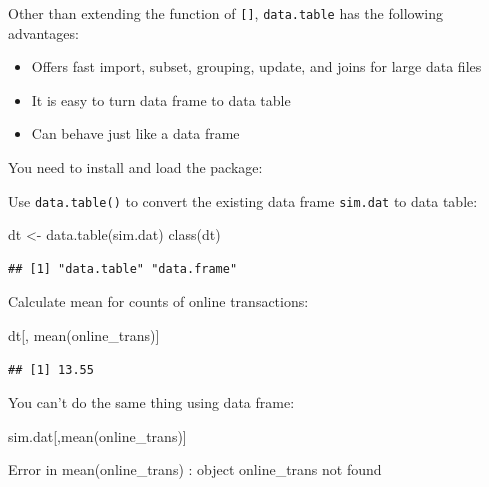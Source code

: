 \documentclass[
  12pt,
]{krantz}
\makeatletter
\newenvironment{Shaded}{\begin{snugshade}}{\end{snugshade}}
\newcommand{\FunctionTok}[1]{\textcolor[rgb]{0,0,0}{#1}}
\newcommand{\NormalTok}[1]{#1}
\newcommand{\OtherTok}[1]{\textcolor[rgb]{0.37,0.37,0.37}{#1}}
\providecommand{\tightlist}{%
  \setlength{\itemsep}{0pt}\setlength{\parskip}{0pt}}
\newenvironment{kframe}{%
\medskip{}
\setlength{\fboxsep}{.8em}
 \def\at@end@of@kframe{}%
 \ifinner\ifhmode%
  \def\at@end@of@kframe{\end{minipage}}%
  \begin{minipage}{\columnwidth}%
 \fi\fi%
 \def\FrameCommand##1{\hskip\@totalleftmargin \hskip-\fboxsep
 \colorbox{shadecolor}{##1}\hskip-\fboxsep
     \hskip-\linewidth \hskip-\@totalleftmargin \hskip\columnwidth}%
 \MakeFramed {\advance\hsize-\width
   \@totalleftmargin\z@ \linewidth\hsize
   \@setminipage}}%
 {\par\unskip\endMakeFramed%
 \at@end@of@kframe}
\renewenvironment{Shaded}{\begin{kframe}}{\end{kframe}}
\makeatother
\begin{document}
Other than extending the function of \texttt{{[}{]}}, \texttt{data.table} has the following advantages:

\begin{itemize}
\tightlist
\item
  Offers fast import, subset, grouping, update, and joins for large data files
\item
  It is easy to turn data frame to data table
\item
  Can behave just like a data frame
\end{itemize}

You need to install and load the package:

Use \texttt{data.table()} to convert the existing data frame \texttt{sim.dat} to data table:

\begin{Shaded}
\begin{Highlighting}[]
\NormalTok{dt }\OtherTok{\textless{}{-}} \FunctionTok{data.table}\NormalTok{(sim.dat)}
\FunctionTok{class}\NormalTok{(dt)}
\end{Highlighting}
\end{Shaded}

\begin{verbatim}
## [1] "data.table" "data.frame"
\end{verbatim}

Calculate mean for counts of online transactions:

\begin{Shaded}
\begin{Highlighting}[]
\NormalTok{dt[, }\FunctionTok{mean}\NormalTok{(online\_trans)]}
\end{Highlighting}
\end{Shaded}

\begin{verbatim}
## [1] 13.55
\end{verbatim}

You can't do the same thing using data frame:

\begin{Shaded}
\begin{Highlighting}[]
\NormalTok{sim.dat[,}\FunctionTok{mean}\NormalTok{(online\_trans)]}
\end{Highlighting}
\end{Shaded}

\begin{Shaded}
\begin{Highlighting}[]
\NormalTok{Error in mean(online\_trans) : object \textquotesingle{}online\_trans\textquotesingle{} not found}
\end{Highlighting}
\end{Shaded}
\end{document}
